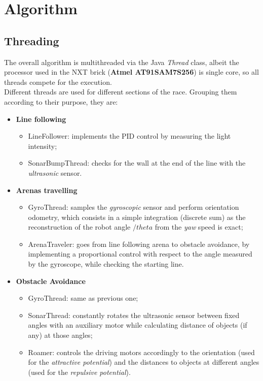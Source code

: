 \documentclass[a4paper,11pt,oneside]{book}
\begin{document}
		
		
		\section{Algorithm}
		\subsection {Threading}
		
		The overall algorithm is multithreaded via the Java \textit{Thread} class, albeit the processor used in the NXT brick (\textbf{Atmel AT91SAM7S256}) is single core, so all threads compete for the execution.\\
		
		Different threads are used for different sections of the race. Grouping them according to their purpose, they are:
		
		\begin{itemize}
			\item \textbf{Line following}
				\begin{itemize}
						\item LineFollower: implements the PID control by measuring the light intensity;
					\item SonarBumpThread: checks for the wall at the end of the line with the \textit{ultrasonic} sensor.
				\end{itemize}
			
			\item \textbf{Arenas travelling}
			\begin{itemize}
					\item GyroThread: samples the \textit{gyroscopic} sensor and perform orientation odometry, which consists in a simple integration (discrete sum) as the reconstruction of the robot angle $/theta$ from the \textit{yaw} speed is exact;
				\item ArenaTraveler: goes from line following arena to obstacle avoidance, by implementing a proportional control with respect to the angle measured by the gyroscope, while checking the starting line.
			\end{itemize}
		
			
			\item \textbf{Obstacle Avoidance}
			\begin{itemize}
				\item GyroThread: same as previous one;
				\item SonarThread: constantly rotates the ultrasonic sensor between fixed angles with an auxiliary motor while calculating distance of objects (if any) at those angles;
				\item Roamer: controls the driving motors accordingly to the orientation (used for the \textit{attractive potential}) and the distances to objects at different angles (used for the \textit{repulsive potential}).
			\end{itemize}
			
		\end{itemize}
		\vspace{7mm}
		
\end{document}
